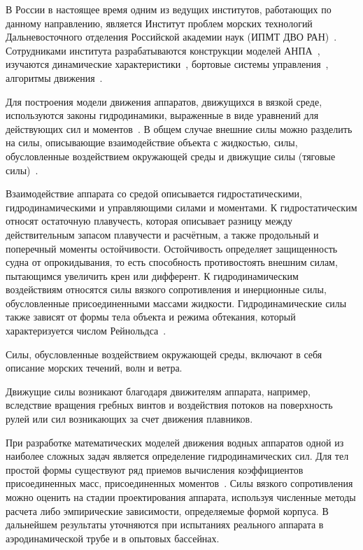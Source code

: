 В России в настоящее время одним из ведущих институтов, работающих по данному направлению, является Институт проблем морских технологий Дальневосточного отделения Российской академии наук (ИПМТ ДВО РАН)~\cite{Ageev, Kiselev_2012, Inzarcev_2018_book}. Сотрудниками института разрабатываются конструкции моделей АНПА~\cite{Boreyko_2011, Iznarcev_2007}, изучаются динамические характеристики~\cite{Kiselev_2012}, бортовые системы управления~\cite{Iznarcev_2005}, алгоритмы движения~\cite{Kiselev_2004}.

Для построения модели движения аппаратов, движущихся в вязкой среде, используются законы гидродинамики, выраженные в виде уравнений для действующих сил и моментов~\cite{Ageev}. В общем случае внешние силы можно разделить на силы, описывающие взаимодействие объекта с жидкостью, силы, обусловленные воздействием окружающей среды и движущие силы (тяговые силы)~\cite{Fossen2}. %

Взаимодействие аппарата со средой описывается гидростатическими, гидродинамическими и управляющими силами и моментами. К гидростатическим относят остаточную плавучесть, которая описывает разницу между действительным запасом плавучести и расчётным, а также продольный и поперечный моменты остойчивости. Остойчивость определяет защищенность судна от опрокидывания, то есть способность противостоять внешним силам, пытающимся увеличить крен или дифферент. К гидродинамическим воздействиям относятся силы вязкого сопротивления и инерционные силы, обусловленные присоединенными массами жидкости. Гидродинамические силы также зависят от формы тела объекта и режима обтекания, который характеризуется числом Рейнольдса~\cite{Ageev}.

Силы, обусловленные воздействием окружающей среды, включают в себя описание морских течений, волн и ветра.

Движущие силы возникают благодаря движителям аппарата, например, вследствие вращения гребных винтов и воздействия потоков на поверхность рулей или сил возникающих за счет движения плавников.

При разработке математических моделей движения водных аппаратов одной из наиболее сложных задач является определение гидродинамических сил. Для тел простой формы существуют ряд приемов вычисления коэффициентов присоединенных масс, присоединенных моментов~\cite{Pantov_etc_1973, Korotkin}. Силы вязкого сопротивления можно оценить на стадии проектирования аппарата, используя численные методы расчета либо эмпирические зависимости, определяемые формой корпуса. В дальнейшем результаты уточняются при испытаниях реального аппарата в аэродинамической трубе и в опытовых бассейнах.

